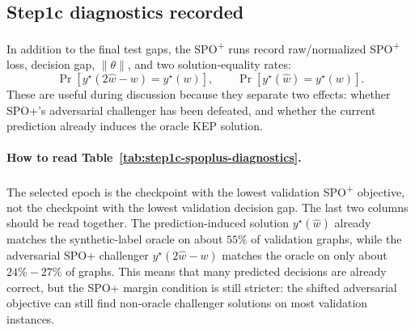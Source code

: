 \documentclass[11pt]{article}
\newcommand{\spoplus}{SPO\textsuperscript{+}}
\begin{document}
\subsection{Step1c diagnostics recorded}

In addition to the final test gaps, the \spoplus{} runs record raw/normalized
\spoplus{} loss, decision gap, \(\|\theta\|\), and two solution-equality rates:
\[
    \Pr\left[y^\star(2\hat w-w)=y^\star(w)\right],
    \qquad
    \Pr\left[y^\star(\hat w)=y^\star(w)\right].
\]
These are useful during discussion because they separate two effects: whether
SPO+'s adversarial challenger has been defeated, and whether the current
prediction already induces the oracle KEP solution.

\begin{table}[H]
\centering
\caption{Step1c validation-SPO+ checkpoint diagnostics on the 2000-graph
validation set. The equality rates are fractions of validation graphs.}
\label{tab:step1c-spoplus-diagnostics}
\end{table}

\paragraph{How to read Table~\ref{tab:step1c-spoplus-diagnostics}.}
The selected epoch is the checkpoint with the lowest validation \spoplus{}
objective, not the checkpoint with the lowest validation decision gap. The last
two columns should be read together. The prediction-induced solution
\(y^\star(\hat w)\) already matches the synthetic-label oracle on about \(55\%\)
of validation graphs, while the adversarial SPO+ challenger
\(y^\star(2\hat w-w)\) matches the oracle on only about \(24\%-27\%\) of graphs.
This means that many predicted decisions are already correct, but the SPO+
margin condition is still stricter: the shifted adversarial objective can still
find non-oracle challenger solutions on most validation instances.
\end{document}
